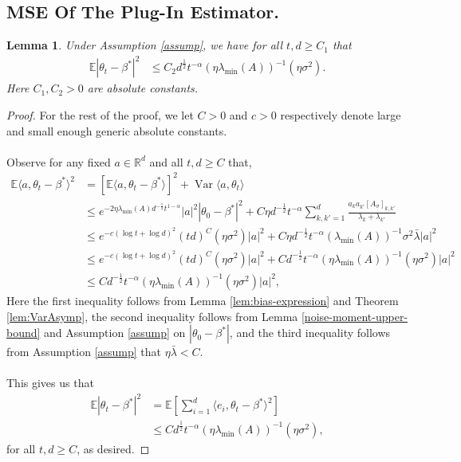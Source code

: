 \documentclass[11pt, reqno,english]{amsart}
\DeclareMathOperator{\Var}{Var} \DeclareMathOperator{\N}{N}
\newtheorem{lemma}{Lemma}[section]
\begin{document}
\subsection{MSE Of The Plug-In Estimator.}
\begin{lemma}\label{euclidean-norm-bound}
Under Assumption \ref{assump}, we have for all $t,d \geq C_1$ that
\begin{align*}
    \mathbb{E}|\theta_t - \beta^*|^2 &\leq C_2d^{\frac{1}{2}}t^{-\alpha}(\eta \lambda_{\min}(A))^{-1}(\eta \sigma^2).
\end{align*}
Here $C_1, C_2 > 0$ are absolute constants.
\end{lemma}
\begin{proof}
For the rest of the proof, we let $C > 0$ and $c>0$ respectively denote large and small enough generic absolute constants.
\\\\
Observe for any fixed $a \in \mathbb{R}^d$ and all $t,d \geq C$ that,
\begin{align*}
    \mathbb{E}\langle a, \theta_t - \beta^*\rangle^2 &= [\mathbb{E}\langle a, \theta_t - \beta^* \rangle]^2 + \Var \langle a, \theta_t \rangle 
    \\
    &\leq e^{-2\eta \lambda_{\min}(A)d^{-\frac{1}{2}}t^{1-\alpha}}|a|^2 |\theta_0 - \beta^*|^2 + C \eta d^{-\frac{1}{2}}t^{-\alpha} \sum_{k,k' = 1}^d \frac{a_k a_{k'}[A_{\sigma}]_{k,k'}}{\lambda_k + \lambda_{k'}}
    \\
    &\leq e^{-c(\log t + \log d)^2}(td)^C (\eta\sigma^2) |a|^2 + C\eta d^{-\frac{1}{2}}t^{-\alpha} (\lambda_{\min}(A))^{-1}\sigma^2 \bar{\lambda}|a|^2
    \\
    &\leq e^{-c(\log t + \log d)^2}(td)^C (\eta\sigma^2) |a|^2 + Cd^{-\frac{1}{2}}t^{-\alpha} (\eta\lambda_{\min}(A))^{-1}(\eta\sigma^2)|a|^2
    \\
    &\leq Cd^{-\frac{1}{2}}t^{-\alpha} (\eta\lambda_{\min}(A))^{-1}(\eta\sigma^2)|a|^2,
\end{align*}
Here the first inequality follows from Lemma \ref{lem:bias-expression} and Theorem \ref{lem:VarAsymp}, the second inequality follows from Lemma \ref{noise-moment-upper-bound} and Assumption \ref{assump} on $|\theta_0 - \beta^*|$, and the third inequality follows from Assumption \ref{assump} that $\eta \bar{\lambda} < C$.
\\\\
This gives us that
\begin{align*}
\mathbb{E}|\theta_t - \beta^*|^2 &= \mathbb{E}[\sum_{i = 1}^d \langle e_i, \theta_t - \beta^* \rangle^2]
\\
&\leq Cd^{\frac{1}{2}}t^{-\alpha}(\eta \lambda_{\min}(A))^{-1}(\eta \sigma^2),
\end{align*}
for all $t,d \geq C$, as desired.
\end{proof}
\end{document}
